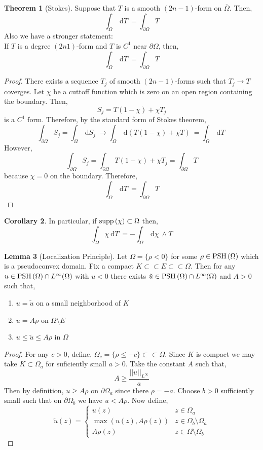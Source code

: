 \documentclass[12pt]{extarticle}
\renewcommand{\d}[1]{\: \mathrm{d}#1 \:}
\theoremstyle{definition}
\newtheorem{theorem}{Theorem}[section]
\newtheorem{lemma}[theorem]{Lemma}
\newtheorem{corollary}[theorem]{Corollary}
\begin{document}
\begin{theorem}[Stokes]
Suppose that $T$ is a smooth $(2n-1)$-form on $\overline{\Omega}$. Then,
\[ \int_{\Omega} \d{T} = \int_{\partial \Omega} T \]
Also we have a stronger statement:
\bigskip\\
If $T$ is a degree $(2n  1)$-form and $T$ is $C^1$ near $\partial \Omega$, then,
\[ \int_{\Omega} \d{T} = \int_{\partial \Omega} T \]
\end{theorem}

\begin{proof}
There exists a sequence $T_j$ of smooth $(2n - 1)$-forms such that $T_j \to T$ coverges. Let $\chi$ be a cuttoff function which is zero on an open region containing the boundary. Then,
\[ S_j = T(1 - \chi) + \chi T_j \]
is a $C^1$ form. Therefore, by the standard form of Stokes theorem,
\[ \int_{\partial \Omega} S_j = \int_{\Omega} \d{S_j} \to \int_\Omega \d{(T(1 - \chi) + \chi T)} = \int_\Omega \d{T} \]
However,
\[ \int_{\partial \Omega} S_j = \int_{\partial \Omega} T (1 - \chi) + \chi T_j = \int_{\partial \Omega} T \]
because $\chi = 0$ on the boundary. Therefore,
\[ \int_{\Omega} \d{T} = \int_{\partial \Omega} T \]
\end{proof}

\begin{corollary}
In particular, if $\mathrm{supp}\left( \chi \right) \subset \Omega$ then,
\[ \int_\Omega \chi \d{T} = - \int_\Omega \d{\chi} \wedge T \]
\end{corollary}

\begin{lemma}[Localization Principle]
Let $\Omega = \{ \rho < 0 \}$ for some $\rho \in \mathrm{PSH}\left( \Omega \right)$ which is a pseudoconvex domain. Fix a compact $K \subset \subset E \subset \subset \Omega$. Then for any $u \in \mathrm{PSH}\left( \Omega \right) \cap L^\infty(\Omega)$ with $u < 0$ there exists $\tilde{u} \in \mathrm{PSH}\left( \Omega \right) \cap L^\infty(\Omega)$ and $A > 0$ such that,
\begin{enumerate}
\item $u = \tilde{u}$ on a small neighborhood of $K$
\item $u = A \rho$ on $\Omega \setminus E$
\item $u \le \tilde{u} \le A \rho$ in $\Omega$
\end{enumerate}
\end{lemma}

\begin{proof}
For any $c > 0$, define, $\Omega_c = \{ \rho \le - c \} \subset \subset \Omega$. Since $K$ is compact we may take $K \subset \Omega_a$ for suficiently small $a > 0$. Take the constant $A$ such that,
\[ A \ge \frac{||u||_{L^\infty}}{a} \]
Then by definition, $u \ge A \rho$ on $\partial \Omega_a$ since there $\rho = - a$. Choose $b > 0$ sufficiently small such that on $\partial \Omega_b$ we have $u < A \rho$. Now define,
\[ \tilde{u}(z) = \begin{cases}
u(z) & z \in \Omega_a
\\
\max{(u(z), A \rho(z))} & z \in \Omega_b \setminus \Omega_a 
\\
A \rho(z) & z \in \Omega \setminus \Omega_b 
\end{cases} \]
\end{proof}
\end{document}
